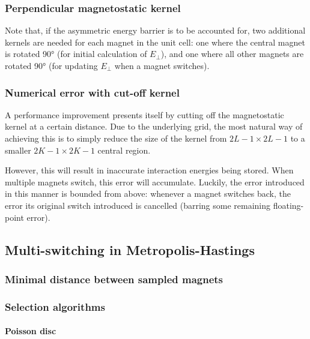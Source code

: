 \subsubsection{Perpendicular magnetostatic kernel} %
Note that, if the asymmetric energy barrier is to be accounted for, two additional kernels are needed for each magnet in the unit cell: one where the central magnet is rotated \ang{90} (for initial calculation of $E_\perp$), and one where all other magnets are rotated \ang{90} (for updating $E_\perp$ when a magnet switches). \par %
\subsubsection{Numerical error with cut-off kernel} %
A performance improvement presents itself by cutting off the magnetostatic kernel at a certain distance.
Due to the underlying grid, the most natural way of achieving this is to simply reduce the size of the kernel from $2L-1 \times 2L-1$ to a smaller $2K-1 \times 2K-1$ central region. \par %
However, this will result in inaccurate interaction energies being stored.
When multiple magnets switch, this error will accumulate.
Luckily, the error introduced in this manner is bounded from above: whenever a magnet switches back, the error its original switch introduced is cancelled (barring some remaining floating-point error).

\subsection{Multi-switching in Metropolis-Hastings} \label{sec:2:MultiSwitch} %
\subsubsection{Minimal distance between sampled magnets} %
\subsubsection{Selection algorithms}
\paragraph{Poisson disc}
